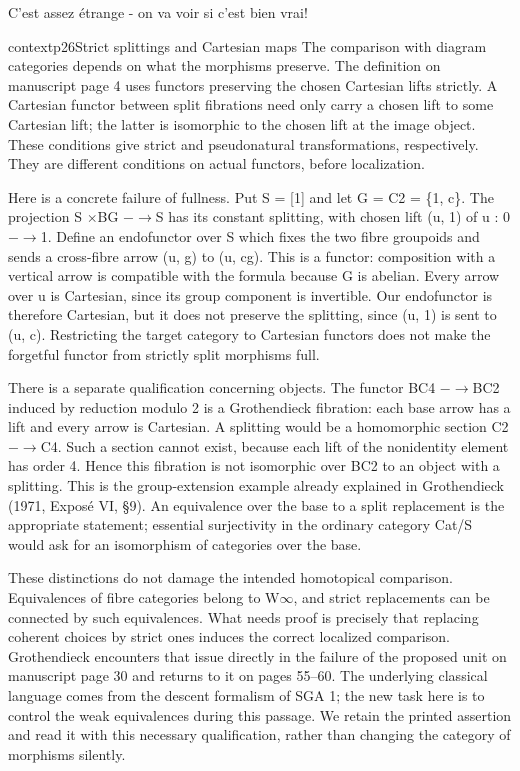 C'est assez étrange - on va voir si c'est bien vrai!

\begin{dcomment}{context}{p26}{Strict splittings and Cartesian maps}
The comparison with diagram categories depends on what the morphisms preserve. The definition on manuscript page 4 uses functors preserving the chosen Cartesian lifts strictly. A Cartesian functor between split fibrations need only carry a chosen lift to some Cartesian lift; the latter is isomorphic to the chosen lift at the image object. These conditions give strict and pseudonatural transformations, respectively. They are different conditions on actual functors, before localization.

Here is a concrete failure of fullness. Put S = [1] and let G = C2 = \{1, c\}. The projection S \ensuremath{\times}BG \ensuremath{-}\ensuremath{\to}S has its constant splitting, with chosen lift (u, 1) of u : 0 \ensuremath{-}\ensuremath{\to}1. Define an endofunctor over S which fixes the two fibre groupoids and sends a cross-fibre arrow (u, g) to (u, cg). This is a functor: composition with a vertical arrow is compatible with the formula because G is abelian. Every arrow over u is Cartesian, since its group component is invertible. Our endofunctor is therefore Cartesian, but it does not preserve the splitting, since (u, 1) is sent to (u, c). Restricting the target category to Cartesian functors does not make the forgetful functor from strictly split morphisms full.

There is a separate qualification concerning objects. The functor BC4 \ensuremath{-}\ensuremath{\to}BC2 induced by reduction modulo 2 is a Grothendieck fibration: each base arrow has a lift and every arrow is Cartesian. A splitting would be a homomorphic section C2 \ensuremath{-}\ensuremath{\to}C4. Such a section cannot exist, because each lift of the nonidentity element has order 4. Hence this fibration is not isomorphic over BC2 to an object with a splitting. This is the group-extension example already explained in Grothendieck (1971, Exposé VI, \S{}9). An equivalence over the base to a split replacement is the appropriate statement; essential surjectivity in the ordinary category Cat/S would ask for an isomorphism of categories over the base.

These distinctions do not damage the intended homotopical comparison. Equivalences of fibre categories belong to W\ensuremath{\infty}, and strict replacements can be connected by such equivalences. What needs proof is precisely that replacing coherent choices by strict ones induces the correct localized comparison. Grothendieck encounters that issue directly in the failure of the proposed unit on manuscript page 30 and returns to it on pages 55--60. The underlying classical language comes from the descent formalism of SGA 1; the new task here is to control the weak equivalences during this passage. We retain the printed assertion and read it with this necessary qualification, rather than changing the category of morphisms silently.

\end{dcomment}


